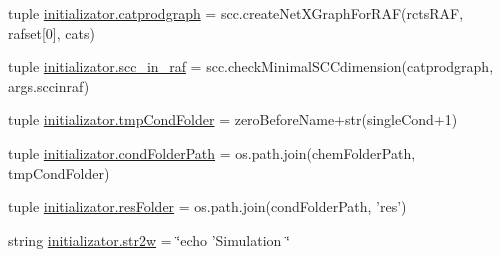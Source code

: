 \begin{DoxyCompactItemize}
$$\item 
tuple \hyperlink{a00135_ae879083e010a0e2af0a12a7d953a6e8b}{initializator.\-catprodgraph} = scc.\-create\-Net\-X\-Graph\-For\-R\-A\-F(rcts\-R\-A\-F, rafset\mbox{[}0\mbox{]}, cats)
\item 
tuple \hyperlink{a00135_a528fd8494c795cfcb3810626c84ae291}{initializator.\-scc\-\_\-in\-\_\-raf} = scc.\-check\-Minimal\-S\-C\-Cdimension(catprodgraph, args.\-sccinraf)
\item 
tuple \hyperlink{a00135_ad43d43e724c966749db268c9b523a02c}{initializator.\-tmp\-Cond\-Folder} = zero\-Before\-Name+str(single\-Cond+1)
\item 
tuple \hyperlink{a00135_a7fe46587523066ae019cbe755f63888a}{initializator.\-cond\-Folder\-Path} = os.\-path.\-join(chem\-Folder\-Path, tmp\-Cond\-Folder)
\item 
tuple \hyperlink{a00135_ae3ceb468287bbef82c0134b3eeea4419}{initializator.\-res\-Folder} = os.\-path.\-join(cond\-Folder\-Path, 'res')
\item 
string \hyperlink{a00135_ae18cfdf290fd3edf979ab55e9dbb65c7}{initializator.\-str2w} = \char`\"{}echo 'Simulation \char`\"{}
\end{DoxyCompactItemize}
